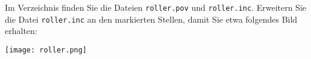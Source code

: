 %
Im Verzeichnis  finden Sie die 
Dateien \texttt{roller.pov} und 
\texttt{roller.inc}. Erweitern Sie die Datei \texttt{roller.inc} an den 
markierten Stellen, damit Sie etwa folgendes Bild erhalten:
\begin{center}
  \texttt{[image: roller.png]}
\end{center} 

